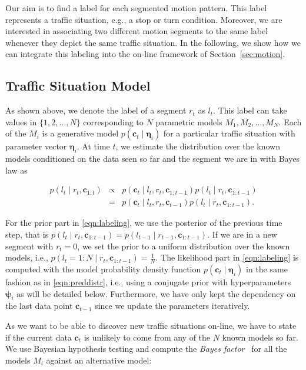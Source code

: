 Our aim is to find a label for each segmented motion pattern. This label
represents a traffic situation, e.g., a stop or turn condition. Moreover, we are
interested in associating two different motion segments to the same label
whenever they depict the same traffic situation. In the following, we show how
we can integrate this labeling into the on-line framework of
Section~\ref{sec:motion}.

\subsection{Traffic Situation Model}
As shown above, we denote the label of a segment $r_t$ as $l_t$. This label can
take values in $\{1,2,\dots,N\}$ corresponding to $N$ parametric models $M_1,
M_2,\dots,M_N$. Each of the $M_i$ is a generative model $p(\mathbf{c}_t\mid
\boldsymbol{\eta}_i)$ for a particular traffic situation with parameter vector
$\boldsymbol{\eta}_i$. At time $t$, we estimate the distribution over the known
models conditioned on the data seen so far and the segment we are in with Bayes
law as

\begin{eqnarray}
\label{eqn:labeling}
p(l_t\mid r_t,\mathbf{c}_{1:t})&\propto&p(\mathbf{c}_t\mid l_t,r_t,
\mathbf{c}_{1:t-1})p(l_t\mid r_t,\mathbf{c}_{1:t-1})\nonumber\\
&=& p(\mathbf{c}_t\mid l_t,r_t,\mathbf{c}_{t-1})p(l_t\mid
r_t,\mathbf{c}_{1:t-1}).
\end{eqnarray}

For the prior part in \eqref{eqn:labeling}, we use the posterior of the previous
time step, that is
$p(l_t\mid r_t,\mathbf{c}_{1:t-1})=p(l_{t-1}\mid r_{t-1},\mathbf{c}_{1:t-1})$.
If we are in a new segment with $r_t=0$, we set the prior to a uniform
distribution over the known models, i.e., $p(l_t=1:N\mid r_t,\mathbf{c}_{1:t-1})=
\frac{1}{N}$. The likelihood part in
\eqref{eqn:labeling} is computed with the model probability density function
$p(\mathbf{c}_t\mid \boldsymbol{\eta}_i)$ in the same fashion as in
\eqref{eqn:preddistr}, i.e., using a conjugate prior with hyperparameters
$\boldsymbol{\psi}_i$ as will be detailed below. Furthermore, we have only kept
the dependency on the last data point $\mathbf{c}_{t-1}$ since we update the
parameters iteratively.

As we want to be able to discover new traffic situations on-line, we have to
state if the current data $\mathbf{c}_t$ is unlikely to come from any of the
$N$ known models so far. We use Bayesian hypothesis testing and compute
the \emph{Bayes factor}~\cite{kass95bayes} for all the models $M_i$ against an
alternative model:

